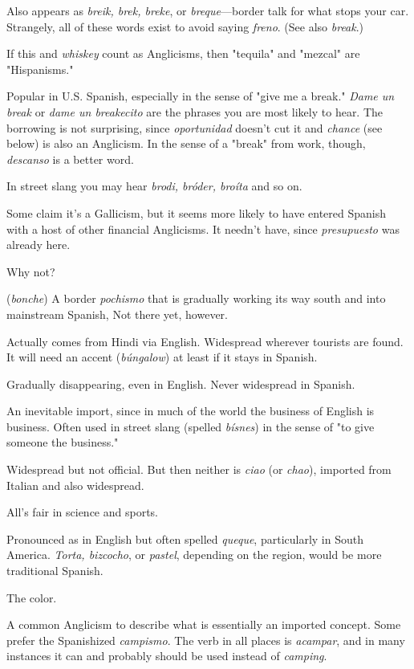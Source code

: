  Also appears as \emph{breik, brek, breke}, or \emph{breque}---border talk for what stops your car. Strangely, all of these words exist to
avoid saying \emph{freno}. (See also \emph{break}.)

 If this and \emph{whiskey} count as Anglicisms, then "tequila" and "mezcal" are "Hispanisms."

 Popular in U.S. Spanish, especially in the sense of "give
me a break." \emph{Dame un break} or \emph{dame un breakecito} are the phrases
you are most likely to hear. The borrowing is not surprising, since
\emph{oportunidad} doesn't cut it and \emph{chance} (see below) is also an Anglicism.
In the sense of a "break" from work, though, \emph{descanso} is a better word.

 In street slang you may hear \emph{brodi, bróder, broíta}
and so on.

 Some claim it's a Gallicism, but it seems more
likely to have entered Spanish with a host of other financial Anglicisms. It needn't have, since \emph{presupuesto} was already here.

 Why not?

 (\emph{bonche}) A border \emph{pochismo} that is gradually
working its way south and into mainstream Spanish, Not there yet,
however.

 Actually comes from Hindi via English. Widespread wherever tourists are found. It will need an accent (\emph{búngalow})
at least if it stays in Spanish.

 Gradually disappearing, even in English. Never widespread in Spanish.

 An inevitable import, since in much of the world
the business of English is business. Often used in street slang (spelled
\emph{bísnes}) in the sense of "to give someone the business."

 Widespread but not official. But then neither is \emph{ciao} (or
\emph{chao}), imported from Italian and also widespread.

 All's fair in science and sports.

 Pronounced as in English but often spelled \emph{queque},
particularly in South America. \emph{Torta, bizcocho}, or \emph{pastel}, depending
on the region, would be more traditional Spanish.

 The color.

 A common Anglicism to describe what is essentially an imported concept. Some prefer the Spanishized \emph{campismo}.
The verb in all places is \emph{acampar}, and in many instances it can and
probably should be used instead of \emph{camping}.


